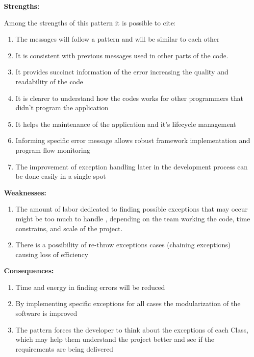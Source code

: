 \documentclass[12pt]{article}
\begin{document}
\begin{flushleft}
\textbf{Strengths:} 

Among the strengths of this pattern it is possible to cite:
\begin{enumerate}
\item The messages will follow a pattern and will be similar to each other

\item It is consistent with previous messages used in other parts of the code.  

\item It provides succinct information of the error increasing the quality and readability of the code

\item It is clearer to understand how the codes works for other programmers that didn’t program the application

\item It helps the maintenance of the application and it's lifecycle management

\item  Informing specific error message allows robust framework implementation and program flow monitoring

\item The improvement of exception handling later in the development process can be done easily in a single spot

\end{enumerate}



\textbf{Weaknesses:}

\begin{enumerate}
\item The amount of labor dedicated to finding possible exceptions that may occur might be too much to handle , depending on the team working the code, time constrains, and scale of the project.

\item There is a possibility of re-throw exceptions cases (chaining exceptions) causing loss of efficiency
\end{enumerate}%


\textbf{Consequences:}

\begin{enumerate}
%
\item Time and energy in finding errors will be reduced
\item By implementing specific exceptions for all cases the modularization of the software is improved
\item The pattern forces the developer to think about the exceptions of each Class, which may help them understand the project better and see if the requirements are being delivered
\end{enumerate}



\end{flushleft}
\end{document}
